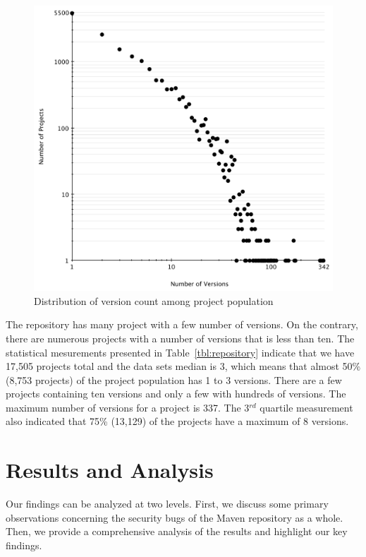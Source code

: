 \documentclass[conference]{IEEEtran}
\begin{document}
\begin{figure}
	\centering
	\includegraphics[scale=0.6]{version_count.pdf}
	\caption{Distribution of version count among project population}
	\label{fig:version-count}
\end{figure}

The repository has many project with a
few number of versions. On the contrary, there are numerous projects with a
number of versions that is less than ten.
The statistical mesurements presented in Table~\ref{tbl:repository}
indicate that we have 17,505 projects total and the data sets median
is 3, which means that almost 50\% (8,753 projects) of the project
population has 1 to 3 versions. There are a few projects containing ten
versions and only a few with hundreds of versions. The maximum number of
versions for a project is 337. The 3$^{rd}$ quartile measurement
also indicated that 75\% (13,129) of the projects have a maximum of 8 versions.

\section{Results and Analysis}
\label{sec:res}

Our findings can be analyzed at two levels. First, we discuss some
primary observations concerning the security bugs of the Maven repository as a whole.
Then, we provide a comprehensive analysis of the results and highlight our key findings.
\end{document}
